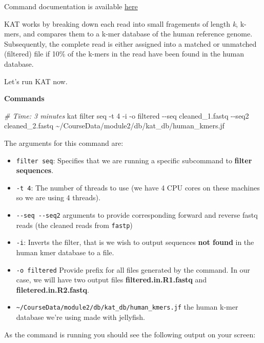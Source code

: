 \documentclass[
]{book}
\newenvironment{Shaded}{\begin{snugshade}}{\end{snugshade}}
\newcommand{\AttributeTok}[1]{\textcolor[rgb]{0.13,0.29,0.53}{#1}}
\newcommand{\CommentTok}[1]{\textcolor[rgb]{0.56,0.35,0.01}{\textit{#1}}}
\newcommand{\ExtensionTok}[1]{#1}
\newcommand{\NormalTok}[1]{#1}
\providecommand{\tightlist}{%
  \setlength{\itemsep}{0pt}\setlength{\parskip}{0pt}}
\begin{document}
Command documentation is available \href{http://kat.readthedocs.io/en/latest/using.html\#sequence-filtering}{here}

KAT works by breaking down each read into small fragements of length \emph{k}, k-mers, and compares them to a k-mer database of the human reference genome. Subsequently, the complete read is either assigned into a matched or unmatched (filtered) file if 10\% of the k-mers in the read have been found in the human database.

Let's run KAT now.

\textbf{Commands}

\begin{Shaded}
\begin{Highlighting}[]
\CommentTok{\# Time: 3 minutes}
\ExtensionTok{kat}\NormalTok{ filter seq }\AttributeTok{{-}t}\NormalTok{ 4 }\AttributeTok{{-}i} \AttributeTok{{-}o}\NormalTok{ filtered }\AttributeTok{{-}{-}seq}\NormalTok{ cleaned\_1.fastq }\AttributeTok{{-}{-}seq2}\NormalTok{ cleaned\_2.fastq \textasciitilde{}/CourseData/module2/db/kat\_db/human\_kmers.jf}
\end{Highlighting}
\end{Shaded}

The arguments for this command are:

\begin{itemize}
\tightlist
\item
  \texttt{filter\ seq}: Specifies that we are running a specific subcommand to \textbf{filter sequences}.
\item
  \texttt{-t\ 4}: The number of threads to use (we have 4 CPU cores on these machines so we are using 4 threads).
\item
  \texttt{-\/-seq\ -\/-seq2} arguments to provide corresponding forward and reverse fastq reads (the cleaned reads from \texttt{fastp})
\item
  \texttt{-i}: Inverts the filter, that is we wish to output sequences \textbf{not found} in the human kmer database to a file.
\item
  \texttt{-o\ filtered} Provide prefix for all files generated by the command. In our case, we will have two output files \textbf{filtered.in.R1.fastq} and \textbf{filetered.in.R2.fastq}.
\item
  \texttt{\textasciitilde{}/CourseData/module2/db/kat\_db/human\_kmers.jf} the human k-mer database we're using made with jellyfish.
\end{itemize}

As the command is running you should see the following output on your screen:
\end{document}
